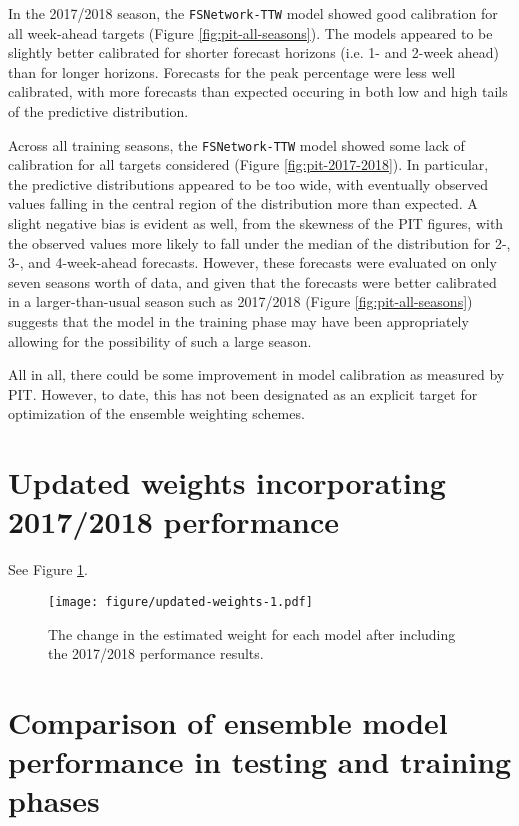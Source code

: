 \documentclass{article}\usepackage[]{graphicx}\usepackage[]{color}
\begin{document}
In the 2017/2018 season, the {\tt FSNetwork-TTW} model showed good calibration for all week-ahead targets (Figure \ref{fig:pit-all-seasons}). 
The models appeared to be slightly better calibrated for shorter forecast horizons (i.e. 1- and 2-week ahead) than for longer horizons. 
Forecasts for the peak percentage were less well calibrated, with more forecasts than expected occuring in both low and high tails of the predictive distribution.

Across all training seasons, the {\tt FSNetwork-TTW} model showed some lack of calibration for all targets considered (Figure \ref{fig:pit-2017-2018}).
In particular, the predictive distributions appeared to be too wide, with eventually observed values falling in the central region of the distribution more than expected.  
A slight negative bias is evident as well, from the skewness of the PIT figures, with the observed values more likely to fall under the median of the distribution for 2-, 3-, and 4-week-ahead forecasts.
However, these forecasts were evaluated on only seven seasons worth of data, and given that the forecasts were better calibrated in a larger-than-usual season such as 2017/2018 (Figure \ref{fig:pit-all-seasons}) suggests that the model in the training phase may have been appropriately allowing for the possibility of such a large season.

All in all, there could be some improvement in model calibration as measured by PIT. 
However, to date, this has not been designated as an explicit target for optimization of the ensemble weighting schemes.



\section{Updated weights incorporating 2017/2018 performance}

See Figure \ref{fig:updated-weights}.

\begin{figure}[htbp]
\begin{center}
\texttt{[image: figure/updated-weights-1.pdf]}
\caption{The change in the estimated weight for each model after including the 2017/2018 performance results.}
\label{fig:updated-weights}
\end{center}
\end{figure}

\clearpage

\section{Comparison of ensemble model performance in testing and training phases}
\end{document}

